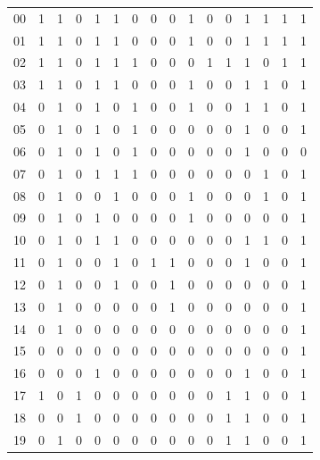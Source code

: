 \begin{esempio}
\begin{table}[H]
\begin{tabular}{c|ccccccccccccccc}
    \hline
    00 & 1 & 1 & 0 & 1 & 1 & 0 & 0 & 0 & 1 & 0 & 0 & 1 & 1 & 1 & 1 \\
    01 & 1 & 1 & 0 & 1 & 1 & 0 & 0 & 0 & 1 & 0 & 0 & 1 & 1 & 1 & 1 \\
    02 & 1 & 1 & 0 & 1 & 1 & 1 & 0 & 0 & 0 & 1 & 1 & 1 & 0 & 1 & 1 \\
    03 & 1 & 1 & 0 & 1 & 1 & 0 & 0 & 0 & 1 & 0 & 0 & 1 & 1 & 0 & 1 \\
    04 & 0 & 1 & 0 & 1 & 0 & 1 & 0 & 0 & 1 & 0 & 0 & 1 & 1 & 0 & 1 \\
    05 & 0 & 1 & 0 & 1 & 0 & 1 & 0 & 0 & 0 & 0 & 0 & 1 & 0 & 0 & 1 \\
    06 & 0 & 1 & 0 & 1 & 0 & 1 & 0 & 0 & 0 & 0 & 0 & 1 & 0 & 0 & 0 \\
    07 & 0 & 1 & 0 & 1 & 1 & 1 & 0 & 0 & 0 & 0 & 0 & 0 & 1 & 0 & 1 \\
    08 & 0 & 1 & 0 & 0 & 1 & 0 & 0 & 0 & 1 & 0 & 0 & 0 & 1 & 0 & 1 \\
    09 & 0 & 1 & 0 & 1 & 0 & 0 & 0 & 0 & 1 & 0 & 0 & 0 & 0 & 0 & 1 \\
    10 & 0 & 1 & 0 & 1 & 1 & 0 & 0 & 0 & 0 & 0 & 0 & 1 & 1 & 0 & 1 \\
    11 & 0 & 1 & 0 & 0 & 1 & 0 & 1 & 1 & 0 & 0 & 0 & 1 & 0 & 0 & 1 \\
    12 & 0 & 1 & 0 & 0 & 1 & 0 & 0 & 1 & 0 & 0 & 0 & 0 & 0 & 0 & 1 \\
    13 & 0 & 1 & 0 & 0 & 0 & 0 & 0 & 1 & 0 & 0 & 0 & 0 & 0 & 0 & 1 \\
    14 & 0 & 1 & 0 & 0 & 0 & 0 & 0 & 0 & 0 & 0 & 0 & 0 & 0 & 0 & 1 \\
    15 & 0 & 0 & 0 & 0 & 0 & 0 & 0 & 0 & 0 & 0 & 0 & 0 & 0 & 0 & 1 \\
    16 & 0 & 0 & 0 & 1 & 0 & 0 & 0 & 0 & 0 & 0 & 0 & 1 & 0 & 0 & 1 \\
    17 & 1 & 0 & 1 & 0 & 0 & 0 & 0 & 0 & 0 & 0 & 1 & 1 & 0 & 0 & 1 \\
    18 & 0 & 0 & 1 & 0 & 0 & 0 & 0 & 0 & 0 & 0 & 1 & 1 & 0 & 0 & 1 \\ 
    19 & 0 & 1 & 0 & 0 & 0 & 0 & 0 & 0 & 0 & 0 & 1 & 1 & 0 & 0 & 1
  \end{tabular}
\end{table}
\end{esempio}
